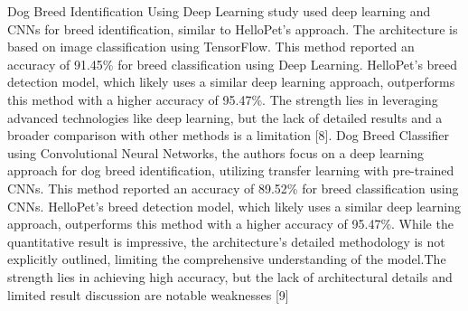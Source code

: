 \noindent Dog Breed Identification Using Deep Learning study used deep learning and
CNNs for breed identification, similar to HelloPet’s approach. The architecture is based
on image classification using TensorFlow. This method reported an accuracy of 91.45\% for breed classification using Deep Learning. HelloPet’s breed detection model, which
likely uses a similar deep learning approach, outperforms this method with a higher
accuracy of 95.47\%. The strength lies in leveraging advanced technologies like deep
learning, but the lack of detailed results and a broader comparison with other methods is
a limitation [8].
Dog Breed Classifier using Convolutional Neural Networks,
the authors focus on a deep learning approach for dog breed identification, utilizing
transfer learning with pre-trained CNNs. This method reported an accuracy of 89.52\%
for breed classification using CNNs. HelloPet’s breed detection model, which likely uses
a similar deep learning approach, outperforms this method with a higher accuracy of
95.47\%. While the quantitative result is impressive, the architecture’s detailed methodology is not explicitly outlined, limiting the comprehensive understanding of the model.The strength lies in achieving high accuracy, but the lack of architectural details and limited result discussion are notable weaknesses [9]
